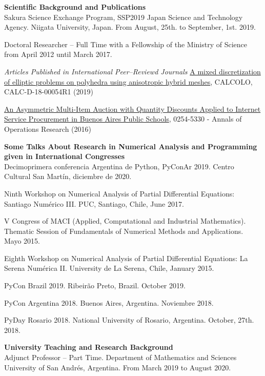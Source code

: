 \textbf{Scientific Background and Publications}\\[6pt]
Sakura Science Exchange Program, SSP2019 Japan Science and Technology Agency.
Niigata University, Japan. From August, 25th. to September, 1st. 2019.

Doctoral Researcher -- Full Time with a Fellowship of the Ministry of Science from April 2012 until March 2017.

\emph{Articles Published in International Peer--Reviewd Journals}
\href{http://em.rdcu.be/wf/click?upn=lMZy1lernSJ7apc5DgYM8RtiRnX98cgbvE81KQGn5tE-3D_-2Fq09Vpjrycd-2BAOhvYDidHaHWLaG8WMoWs1lRs2mKTzqCwYNFhlGtplH8kb8yUCOrEFESCWAEP1qrD-2BJgg09nu-2Fz61XDXWYdppeXx4JzFRLvI-2FYyjZMrov-2FaxFxLv9MaqfC-2BjYanB-2FkLIArphbTB7hvuq-2BJ-2BP0dpoVrgh2NJYizQcMbyo6AA8jcx6RYsWvb3RMk9c7QXTqmoLaHKr8Xg6yK2lC1IxrYwuPPxXUxfxXQc0WAqTO-2Bg-2F9P-2BWkhJXyogoqkg5GNjl1KqQhJV5xi014g-3D-3D}
{\color{blue}A mixed discretization of elliptic problems on polyhedra using anisotropic hybrid meshes}, CALCOLO, CALC-D-18-00054R1 (2019)

\href{https://www.dropbox.com/s/1ai0z0pcyhskpzp/JM-2016.pdf?dl=0}
{\color{blue}An Asymmetric Multi-Item Auction with Quantity Discounts Applied
to Internet Service Procurement in Buenos Aires Public Schools}, 0254-5330 - 
Annals of Operations Research (2016)

\textbf{Some Talks About Research in Numerical Analysis and Programming given
in International Congresses}\\[6pt]
Decimoprimera conferencia Argentina de Python, PyConAr 2019. Centro Cultural San Mart\'in, diciembre de 2020.

Ninth Workshop on Numerical Analysis of Partial Differential Equations: Santiago Num\'erico III. PUC, Santiago, Chile, June 2017.

V Congress of MACI (Applied, Computational and Industrial Mathematics). Thematic Session of Fundamentals of Numerical Methods and Applications.
Mayo 2015.

Eighth Workshop on Numerical Analysis of Partial Differential Equations: La Serena Num\'erica II. University de La Serena, Chile, January 2015.

PyCon Brazil 2019. Ribeir\~ao Preto, Brazil. October 2019.

PyCon Argentina 2018. Buenos Aires, Argentina. Noviembre 2018.

PyDay Rosario 2018. National University of Rosario, Argentina. October, 27th.
2018.

\textbf{University Teaching and Research Background}\\[6pt]
Adjunct Professor -- Part Time. Department of Mathematics and Sciences 
University of San Andr\'es, Argentina. From March 2019 to August 2020.

